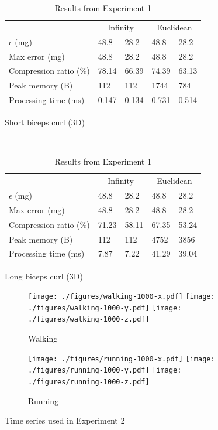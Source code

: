 \documentclass[10pt, conference, compsocconf]{IEEEtran}
\begin{document}
\begin{table}
\begin{subfigure}{\columnwidth}
\begin{tabular}{l|l|l|l|l}
    \hline
    \rowcolor{headcolor}
                           & \multicolumn{2}{c|}{Infinity} & \multicolumn{2}{c}{Euclidean} \\
    \rowcolor{headcolor}
    $\epsilon$ (mg)        & 48.8          & 28.2          & 48.8   & 28.2   \\
    \hline
    Max error  (mg)        & 48.8          & 28.2          & 48.8   & 28.2   \\
    Compression ratio (\%) & 78.14         & 66.39         & 74.39  & 63.13   \\
    Peak memory (B)        & 112           & 112           & 1744   & 784    \\
    Processing time (ms)   & 0.147         & 0.134         & 0.731  & 0.514  \\ \hline
    \end{tabular}
    \caption{Short biceps curl (3D)}
    \end{subfigure}\\
    \begin{subfigure}{\columnwidth}
    \centering
    \begin{tabular}{l|l|l|l|l}
    \hline
    \rowcolor{headcolor}
                              & \multicolumn{2}{c|}{Infinity} & \multicolumn{2}{c}{Euclidean} \\
    \rowcolor{headcolor}
    $\epsilon$ (mg)                & 48.8        & 28.2       & 48.8     & 28.2    \\
    \hline
    Max error  (mg)                & 48.8        & 28.2       & 48.8     & 28.2    \\
    Compression ratio (\%)         & 71.23       & 58.11      & 67.35    & 53.24   \\
    Peak memory (B)                & 112         & 112        & 4752     & 3856    \\
    Processing time (ms)           & 7.87        & 7.22       & 41.29    & 39.04   \\ \hline
    \end{tabular}
    \caption{Long biceps curl (3D)}
    \end{subfigure}
    \caption{Results from Experiment 1}
    \label{table:results-validation}
\end{table}

\begin{figure}
\centering
\begin{subfigure}{1.85\columnwidth}
\centering
\texttt{[image: ./figures/walking-1000-x.pdf]}
\texttt{[image: ./figures/walking-1000-y.pdf]}
\texttt{[image: ./figures/walking-1000-z.pdf]}
\caption{Walking}
\end{subfigure}
\begin{subfigure}{1.85\columnwidth}
\centering
\texttt{[image: ./figures/running-1000-x.pdf]}
\texttt{[image: ./figures/running-1000-y.pdf]}
\texttt{[image: ./figures/running-1000-z.pdf]}
\caption{Running}
\end{subfigure}
\caption{Time series used in Experiment 2 \vspace*{-0.3cm}}
\label{fig:datasets-2}
\end{figure}
\end{document}
